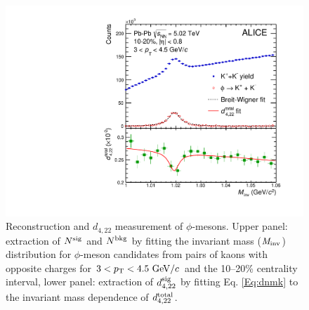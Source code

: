 \begin{figure}[!htb]
\begin{center}
\includegraphics[scale=0.45]{figures/analysisMethod/flowmass_new.pdf}
\end{center}
\caption{Reconstruction and $d_{4,22}$ measurement of $\phi$-mesons. Upper panel: extraction of $N^{\rm{sig}}$ and $N^{\rm{bkg}}$ by fitting the invariant mass (${\it M}_{\rm{inv}}$) distribution for $\phi$-meson candidates from pairs of kaons with opposite charges for $3<p_{\rm{T}}<4.5~{\rm GeV}/c$ and the 10--20\% centrality interval, lower panel: extraction of $d_{4,22}^{\rm sig}$ by fitting Eq. \ref{Eq:dnmk} to the invariant mass dependence of $d_{4,22}^{\rm total}$.}
\label{d422_phi_meson}
\end{figure}
 